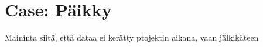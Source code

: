 
 \chapter{Case: Päikky}

Maininta siitä, että dataa ei kerätty ptojektin aikana, vaan jälkikäteen






